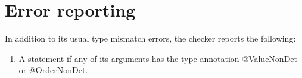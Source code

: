 \section{Error reporting\label{error-reporting}}
In addition to its usual type mismatch errors, the checker reports the following:
\begin{enumerate}
	\item A  statement if any of its arguments has the type annotation @ValueNonDet or @OrderNonDet.	
\end{enumerate}
